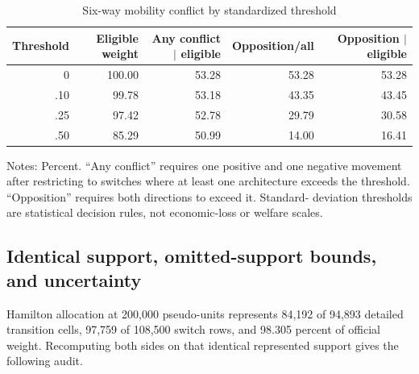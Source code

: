 \begin{table}[htbp]
\centering
\caption{Six-way mobility conflict by standardized threshold}\label{tab:appmobilitythresholds}
\small
\begin{threeparttable}
\begin{tabular}{rrrrr}
\toprule
Threshold & Eligible weight & Any conflict $\mid$ eligible & Opposition/all & Opposition $\mid$ eligible\\
\midrule
0&100.00&53.28&53.28&53.28\\
.10&99.78&53.18&43.35&43.45\\
.25&97.42&52.78&29.79&30.58\\
.50&85.29&50.99&14.00&16.41\\
\bottomrule
\end{tabular}
\begin{tablenotes}[flushleft]\footnotesize
\item Notes: Percent.  ``Any conflict'' requires one positive and one negative
movement after restricting to switches where at least one architecture exceeds
the threshold.  ``Opposition'' requires both directions to exceed it.  Standard-
deviation thresholds are statistical decision rules, not economic-loss or
welfare scales.
\end{tablenotes}
\end{threeparttable}
\end{table}

\subsection{Identical support, omitted-support bounds, and uncertainty}

Hamilton allocation at 200,000 pseudo-units represents 84,192 of 94,893
detailed transition cells, 97,759 of 108,500 switch rows, and 98.305 percent of
official weight.  Recomputing both sides on that identical represented support
gives the following audit.

